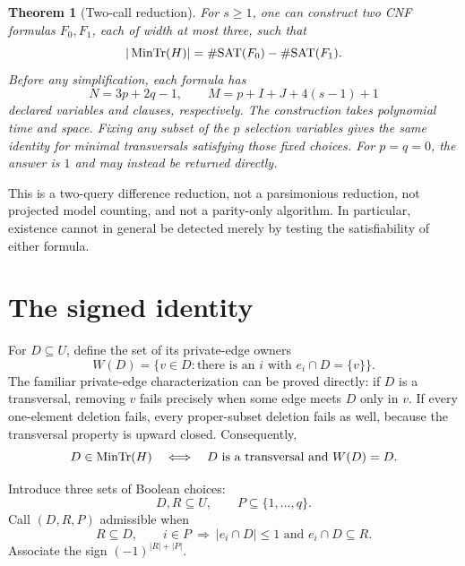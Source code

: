 \documentclass[11pt]{article}
\newtheorem{theorem}{Theorem}
\theoremstyle{remark}\newtheorem{remark}[theorem]{Remark}
\newcommand{\MT}{\mathop{\rm MinTr}}
\newcommand{\sat}{\#\mathrm{SAT}}
\begin{document}
\begin{theorem}[Two-call reduction]\label{thm:main}
For $s\ge1$, one can construct two CNF formulas $F_0,F_1$, each of width at most
three, such that
\[
 |\MT(H)|=\sat(F_0)-\sat(F_1).
\]
Before any simplification, each formula has
\[
 N=3p+2q-1,\qquad M=p+I+J+4(s-1)+1
\]
declared variables and clauses, respectively. The construction takes polynomial
time and space. Fixing any subset of the $p$ selection variables gives the same
identity for minimal transversals satisfying those fixed choices.
For $p=q=0$, the answer is $1$ and may instead be returned directly.
\end{theorem}

This is a two-query difference reduction, not a
parsimonious reduction, not projected model counting, and not a parity-only
algorithm. In particular, existence cannot in general be detected merely by
testing the satisfiability of either formula.

\section{The signed identity}
For $D\subseteq U$, define the set of its private-edge owners
\[
 W(D)=\{v\in D:\text{there is an }i\text{ with }e_i\cap D=\{v\}\}.
\]
The familiar private-edge characterization can be proved directly: if $D$ is
a transversal, removing $v$ fails precisely when some edge meets $D$ only in
$v$. If every one-element deletion fails, every proper-subset deletion fails
as well, because the transversal property is upward closed. Consequently,
\begin{equation}\label{eq:private}
 D\in\MT(H)\quad\Longleftrightarrow\quad
 D\text{ is a transversal and }W(D)=D.
\end{equation}

Introduce three sets of Boolean choices:
\[
 D,R\subseteq U,\qquad P\subseteq\{1,\ldots,q\}.
\]
Call $(D,R,P)$ admissible when
\begin{equation}\label{eq:admissible}
 R\subseteq D,\qquad
 i\in P\ \Longrightarrow\ |e_i\cap D|\le1\text{ and }e_i\cap D\subseteq R.
\end{equation}
Associate the sign $(-1)^{|R|+|P|}$.
\end{document}
